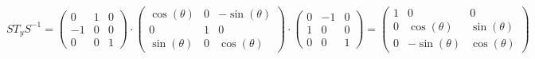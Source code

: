 \documentclass{article}
\begin{document}
\begin{equation*}
    ST_y S^{-1} = 
    \begin{pmatrix}
        0 & 1 & 0 \\
        -1 & 0 & 0 \\
        0 & 0 & 1
    \end{pmatrix}
    \cdot
    \begin{pmatrix}
        \cos(\theta) & 0 & -\sin(\theta) \\
        0 & 1 & 0 \\
        \sin(\theta) & 0 & \cos(\theta)
    \end{pmatrix}
    \cdot
    \begin{pmatrix}
        0 & -1 & 0 \\
        1 & 0 & 0 \\
        0 & 0 & 1
    \end{pmatrix}
    =
    \begin{pmatrix}
        1 & 0 & 0 \\
        0 & \cos(\theta) & \sin(\theta) \\
        0 & -\sin(\theta) & \cos(\theta)
    \end{pmatrix}
\end{equation*}
\end{document}
